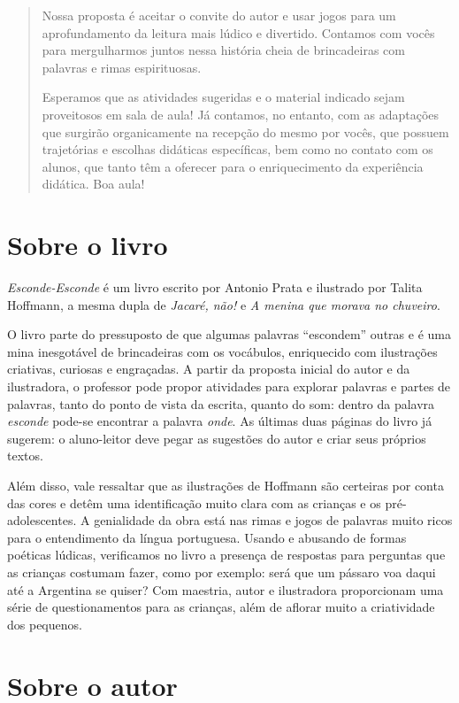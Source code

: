 \documentclass[11pt]{extarticle}
\begin{document}
\begin{abstract}
Nossa proposta é aceitar o convite do autor e usar jogos para um aprofundamento da leitura mais lúdico e divertido. Contamos com vocês para mergulharmos juntos nessa história cheia de brincadeiras com palavras e rimas espirituosas. 

Esperamos que as atividades sugeridas e o material indicado sejam proveitosos em sala de aula! Já contamos, no entanto, com as adaptações
que surgirão organicamente na recepção do mesmo por vocês, que possuem 
trajetórias e escolhas didáticas específicas, bem como no contato com os 
alunos, que tanto têm a oferecer para o enriquecimento da experiência didática.
Boa aula!

\end{abstract}

\section{Sobre o livro}

\textit{Esconde-Esconde} é um livro escrito por Antonio Prata e ilustrado por Talita Hoffmann, a mesma dupla de \textit{Jacaré, não!} e \textit{A menina que morava no chuveiro}. 

O livro parte do pressuposto de que algumas palavras “escondem” outras e é uma mina inesgotável de brincadeiras com os vocábulos, enriquecido com ilustrações criativas, curiosas e engraçadas. A partir da proposta inicial do autor e da ilustradora, o professor pode propor atividades para explorar palavras e partes de palavras, tanto do ponto de vista da escrita, quanto do som: dentro da palavra \textit{esconde} pode-se encontrar a palavra \textit{onde}. As últimas duas páginas do livro já sugerem: o aluno-leitor deve pegar as sugestões do autor e criar seus próprios textos.

Além disso, vale ressaltar que as ilustrações de Hoffmann são certeiras por conta das cores e detêm uma identificação muito clara com as crianças e os pré-adolescentes. A genialidade da obra está nas rimas e jogos de palavras muito ricos para o entendimento da língua portuguesa. Usando e abusando de formas poéticas lúdicas, verificamos no livro a presença de respostas para perguntas que as crianças costumam fazer, como por exemplo: será que um pássaro voa daqui até a Argentina se quiser? Com maestria, autor e ilustradora proporcionam uma série de questionamentos para as crianças, além de aflorar muito a criatividade dos pequenos.

\section{Sobre o autor}
\end{document}
